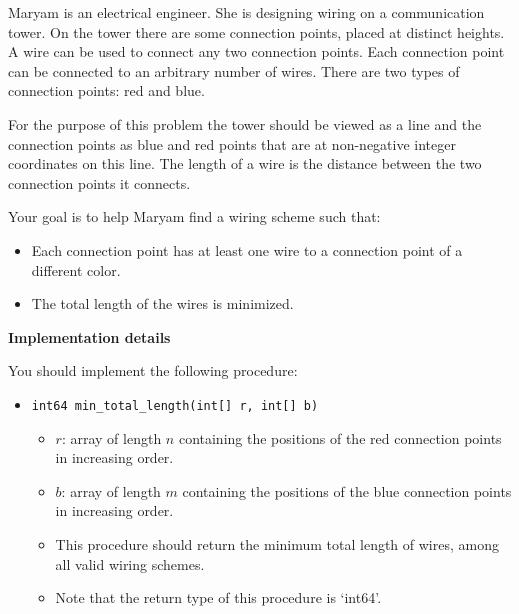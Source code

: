 Maryam is an electrical engineer. She is designing wiring on a communication tower. On the tower there are some connection points, placed at distinct heights. A wire can be used to connect any two connection points. Each connection point can be connected to an arbitrary number of wires. There are two types of connection points: red and blue.

For the purpose of this problem the tower should be viewed as a line and the connection points as blue and red points that are at non-negative integer coordinates on this line. The length of a wire is the distance between the two connection points it connects.

Your goal is to help Maryam find a wiring scheme such that:

\begin{itemize}
\item Each connection point has at least one wire to a connection point of a different color.
\item The total length of the wires is minimized.
\end{itemize}

\textbf{Implementation details}

You should implement the following procedure:

\begin{itemize}
\item \texttt{int64 min\_total\_length(int[] r, int[] b)}
\begin{itemize}
\item $r$: array of length $n$ containing the positions of the red connection points in increasing order.
\item $b$: array of length $m$ containing the positions of the blue connection points in increasing order.
\item This procedure should return the minimum total length of wires, among all valid wiring schemes.
\item Note that the return type of this procedure is `int64'.
\end{itemize}
\end{itemize}


